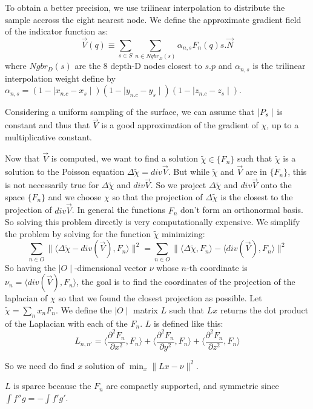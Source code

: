 \documentclass[12pt]{article}
\begin{document}

To obtain a better precision, we use trilinear interpolation to distribute the sample accross the eight nearest node. We define the approximate gradient field of the indicator function as:
$$\vec{V}(q) \equiv \sum_{s \in S} \sum_{n \in Ngbr_D(s)} \alpha_{n,s}F_n(q)s.\vec{N}$$
where $Ngbr_D(s)$ are the 8 depth-D nodes closest to $s.p$ and $\alpha_{n,s}$ is the trilinear interpolation weight define by $\alpha_{n,s} = (1 - \mid{}x_{n.c} - x_s \mid)(1 - \mid y_{n.c} - y_s\mid)(1 - \mid z_{n.c} - z_s\mid)$.

Considering a uniform sampling of the surface, we can assume that $\\|P_s\mid$ is constant and thus that $\vec{V}$ is a good approximation of the gradient of $\chi$, up to a multiplicative constant.

Now that $\vec{V}$ is computed, we want to find a solution $\tilde{\chi} \in \{F_n\}$ such that $\tilde{\chi}$ is a solution to the Poisson equation $\Delta\tilde{\chi} = div{\vec{V}}$. But while $\tilde{\chi}$ and $\vec{V}$ are in $\{F_n\}$, this is not necessarily true for $\Delta\tilde{\chi}$ and $div{\vec{V}}$. So we project $\Delta\tilde{\chi}$ and $div{\vec{V}}$ onto the space $\{F_n\}$ and we choose $\chi$ so that the projection of $\Delta\tilde{\chi}$ is the closest to the projection of $div{\vec{V}}$. In general the functions $F_n$ don't form an orthonormal basis. So solving this problem directly is very computationally expensive. We simplify the problem by solving for the function $\tilde{\chi}$ minimizing:
$$\sum_{n \in O}\|\langle\Delta\tilde{\chi}-div(\vec{V}),F_n\rangle\|^2 = \sum_{n \in O}\|\langle\Delta\tilde{\chi},F_n\rangle - \langle div(\vec{V}), F_n\rangle\|^2$$
So having the $\mid O \mid$-dimensional vector $\nu$ whose $n$-th coordinate is $\nu_n = \langle div(\vec{V}), F_n\rangle$, the goal is to find the coordinates of the projection of the laplacian of $\chi$ so that we found the closest projection as possible. Let $\tilde{\chi} = \sum_n x_n F_n$. We define the $\mid O \mid$ matrix $L$ such that $Lx$ returns the dot product of the Laplacian with each of the $F_n$. $L$ is defined like this:
$$L_{n,n'} = \langle\frac{\partial^2F_n}{\partial x^2}, F_n\rangle + \langle\frac{\partial^2F_n}{\partial y^2}, F_n\rangle + \langle\frac{\partial^2F_n}{\partial z^2}, F_n\rangle$$ 

So we need do find $x$ solution of $\min_{x}\|Lx - \nu\|^2$.

$L$ is sparce because the $F_n$ are compactly supported, and symmetric since $\int f''g = -\int f'g'$.
\end{document}
